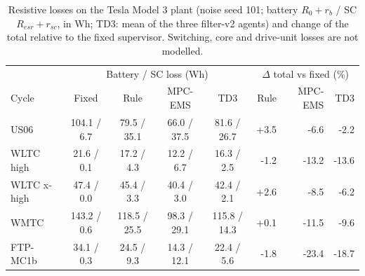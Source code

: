 \begin{table}[t]
\centering\footnotesize
\caption{Resistive losses on the Tesla Model 3 plant (noise seed 101; battery $R_0+r_b$ / SC $R_{esr}+r_{sc}$, in Wh; TD3: mean of the three filter-v2 agents) and change of the total relative to the fixed supervisor. Switching, core and drive-unit losses are not modelled.}
\label{tab:loss}
\begin{tabular}{@{}lccccrrr@{}}
\toprule
 & \multicolumn{4}{c}{Battery / SC loss (Wh)} & \multicolumn{3}{c}{$\Delta$ total vs fixed (\%)}\\
Cycle & Fixed & Rule & MPC-EMS & TD3 & Rule & MPC-EMS & TD3\\
\midrule
US06 & 104.1 / 6.7 & 79.5 / 35.1 & 66.0 / 37.5 & 81.6 / 26.7 & +3.5 & -6.6 & -2.2\\
WLTC high & 21.6 / 0.1 & 17.2 / 4.3 & 12.2 / 6.7 & 16.3 / 2.5 & -1.2 & -13.2 & -13.6\\
WLTC x-high & 47.4 / 0.0 & 45.4 / 3.3 & 40.4 / 3.0 & 42.4 / 2.1 & +2.6 & -8.5 & -6.2\\
WMTC & 143.2 / 0.6 & 118.5 / 25.5 & 98.3 / 29.1 & 115.8 / 14.3 & +0.1 & -11.5 & -9.6\\
FTP-MC1b & 34.1 / 0.3 & 24.5 / 9.3 & 14.3 / 12.1 & 22.4 / 5.6 & -1.8 & -23.4 & -18.7\\
\bottomrule
\end{tabular}
\end{table}
